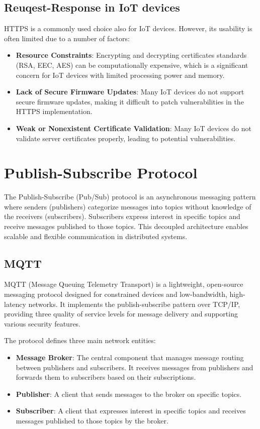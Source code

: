 \documentclass[12pt,a4paper,twoside]{book}
\begin{document}
\subsection{Reuqest-Response in IoT devices}
HTTPS is a commonly used choice also for IoT devices. However, its usability is often limited due to a number of factors:
\begin{itemize}
    \item \textbf{Resource Constraints\cite{mazhar2023iotsecurity}}: Encrypting and decrypting certificates standards (RSA, EEC, AES) can be computationally expensive, which is a significant concern for IoT devices with limited processing power and memory.
    \item \textbf{Lack of Secure Firmware Updates\cite{cyberark2024iot}}: Many IoT devices do not support secure firmware updates, making it difficult to patch vulnerabilities in the HTTPS implementation.
    \item \textbf{Weak or Nonexistent Certificate Validation\cite{bishopfox2020weakcertificates}}: Many IoT devices do not validate server certificates properly, leading to potential vulnerabilities.
\end{itemize}

\section{Publish-Subscribe Protocol}
The Publish-Subscribe (Pub/Sub) protocol is an asynchronous messaging pattern where senders (publishers) categorize messages into topics without knowledge of the receivers (subscribers). Subscribers express interest in specific topics and receive messages published to those topics. This decoupled architecture enables scalable and flexible communication in distributed systems.

\subsection{MQTT}
MQTT (Message Queuing Telemetry Transport) is a lightweight, open-source messaging protocol designed for constrained devices and low-bandwidth, high-latency networks. It implements the publish-subscribe pattern over TCP/IP, providing three quality of service levels for message delivery and supporting various security features.

The protocol defines three main network entities:
\begin{itemize}
    \item \textbf{Message Broker}: The central component that manages message routing between publishers and subscribers. It receives messages from publishers and forwards them to subscribers based on their subscriptions.
    \item \textbf{Publisher}: A client that sends messages to the broker on specific topics. 
    \item \textbf{Subscriber}: A client that expresses interest in specific topics and receives messages published to those topics by the broker.
\end{itemize}
\end{document}
